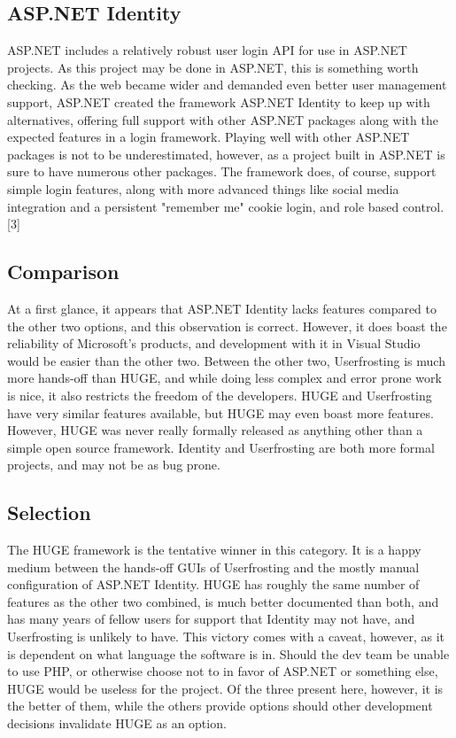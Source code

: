\documentclass[onecolumn, draftclsnofoot,10pt, compsoc]{IEEEtran}
\begin{document}
\subsection{ASP.NET Identity}
ASP.NET includes a relatively robust user login API for use in ASP.NET projects. As this project may be done in ASP.NET, this is something worth checking. As the web
became wider and demanded even better user management support, ASP.NET created the framework ASP.NET Identity to keep up with alternatives, offering full support with
other ASP.NET packages along with the expected features in a login framework. Playing well with other ASP.NET packages is not to be underestimated, however, as a project 
built in ASP.NET is sure to have numerous other packages. The framework does, of course, support simple login features, along with more advanced things like social media 
integration and a persistent "remember me" cookie login, and role based control.[3]
\subsection{Comparison}
At a first glance, it appears that ASP.NET Identity lacks features compared to the other two options, and this observation is correct. However, it does boast the reliability of
Microsoft's products, and development with it in Visual Studio would be easier than the other two. Between the other two, Userfrosting is much more hands-off than HUGE, and 
while doing less complex and error prone work is nice, it also restricts the freedom of the developers. HUGE and Userfrosting have very similar features available, but HUGE may 
even boast more features. However, HUGE was never really formally released as anything other than a simple open source framework. Identity and Userfrosting are both more formal 
projects, and may not be as bug prone.
\subsection{Selection}
The HUGE framework is the tentative winner in this category. It is a happy medium between the hands-off GUIs of Userfrosting and the mostly manual configuration of ASP.NET Identity.
HUGE has roughly the same number of features as the other two combined, is much better documented than both, and has many years of fellow users for support that Identity may
not have, and Userfrosting is unlikely to have. This victory comes with a caveat, however, as it is dependent on what language the software is in. Should the dev team be unable to
use PHP, or otherwise choose not to in favor of ASP.NET or something else, HUGE would be useless for the project. Of the three present here, however, it is the better of them, 
while the others provide options should other development decisions invalidate HUGE as an option.
\end{document}

